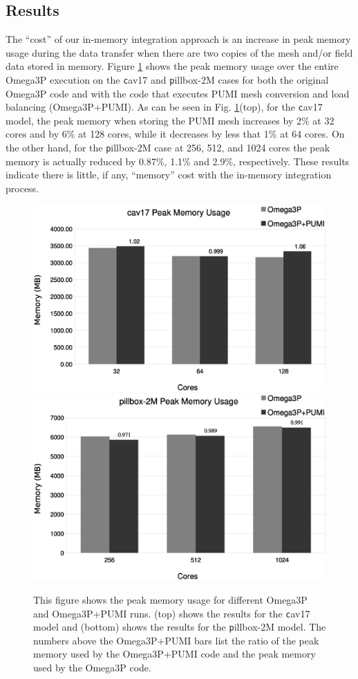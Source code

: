 \documentclass[review,12pt]{elsarticle_summary_report}
\begin{document}
\subsection{\label{in_memory_results} Results}
The ``cost'' of our in-memory integration approach is an increase in peak memory
usage during the data transfer when there are two copies of the mesh and/or
field data stored in memory.
Figure \ref{fig:memusage} shows the peak memory usage over the entire Omega3P
execution on the {\texttt cav17} and {\texttt pillbox-2M} cases for both the
original Omega3P code and with the code that executes PUMI mesh conversion and
load balancing (Omega3P+PUMI). As can be seen in Fig. \ref{fig:memusage}(top), for the {\texttt cav17} model, the peak memory when storing the PUMI mesh increases by 2\% at 32 cores and by 6\% at 128 cores, while it decreases by less that 1\% at 64 cores.
On the other hand, for the {\texttt pillbox-2M} case at 256, 512, and 1024 cores the peak memory is actually reduced by 0.87\%, 1.1\% and 2.9\%, respectively. These results indicate there is little, if any, ``memory'' cost with the in-memory integration process.

\begin{figure}[!ph]
\centering
  \includegraphics[width=.75\textwidth]{cav17-peak-mem.eps}
  \includegraphics[width=.75\textwidth]{pillbox2M-peak-mem.eps}
  \caption{\label{fig:memusage} This figure shows the peak memory usage for different Omega3P and Omega3P+PUMI runs. (top) shows the results for the {\texttt cav17 model} and (bottom) shows the results for the {\texttt pillbox-2M} model. The numbers above the Omega3P+PUMI bars list the ratio of the peak memory used by the Omega3P+PUMI code and the peak memory used by the Omega3P code.}
\end{figure}
\end{document}
